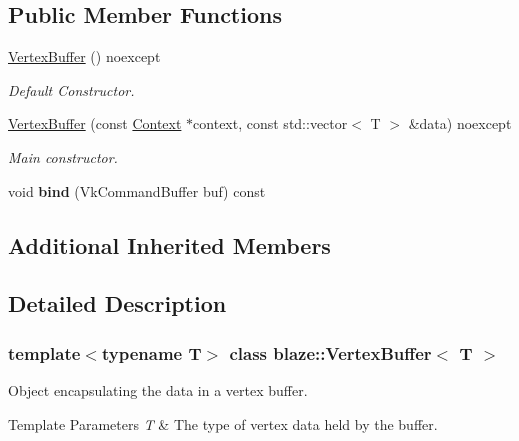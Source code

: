 \subsection*{Public Member Functions}
\begin{DoxyCompactItemize}
\item 
\mbox{\label{classblaze_1_1VertexBuffer_af1ee16f904c7f531dfd3f0cd14f9b89b}} 
\hyperlink{classblaze_1_1VertexBuffer_af1ee16f904c7f531dfd3f0cd14f9b89b}{Vertex\+Buffer} () noexcept
\begin{DoxyCompactList}\small\item\em Default Constructor. \end{DoxyCompactList}\item 
\hyperlink{classblaze_1_1VertexBuffer_a6852238a5dfe856d9cee5532498ecdcc}{Vertex\+Buffer} (const \hyperlink{classblaze_1_1Context}{Context} $\ast$context, const std\+::vector$<$ T $>$ \&data) noexcept
\begin{DoxyCompactList}\small\item\em Main constructor. \end{DoxyCompactList}\item 
\mbox{\label{classblaze_1_1VertexBuffer_acd64f1e4e28aefee16fb3a720d0490cd}} 
void {\bfseries bind} (Vk\+Command\+Buffer buf) const
\end{DoxyCompactItemize}
\subsection*{Additional Inherited Members}


\subsection{Detailed Description}
\subsubsection*{template$<$typename T$>$\newline
class blaze\+::\+Vertex\+Buffer$<$ T $>$}

Object encapsulating the data in a vertex buffer. 


\begin{DoxyTemplParams}{Template Parameters}
{\em T} & The type of vertex data held by the buffer. \\
\hline
\end{DoxyTemplParams}


